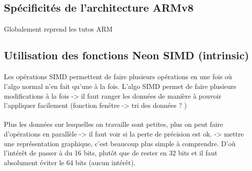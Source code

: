 \documentclass{article}
\begin{document}
    \subsection{Spécificités de l'architecture ARMv8}
    \paragraph{}
    Globalement reprend les tutos ARM

    \subsection{Utilisation des fonctions Neon SIMD (intrinsic)}

    \paragraph{}
    Les opérations SIMD permettent de faire plusieurs opérations en une fois où l'algo normal n'en fait qu'une à la fois. L'algo SIMD permet de faire plusieurs modifications à la fois -> il faut ranger les données de manière à pouvoir l'appliquer facilement (fonction fenêtre -> tri des données ? )


    \paragraph{}
    Plus les données sur lesquelles on travaille sont petites, plus on peut faire d'opérations en parallèle -> il faut voir si la perte de précision est ok. -> mettre une représentation graphique, c'est beaucoup plus simple à comprendre. D'où l'intérêt de passer à du 16 bits, plutôt que de rester en 32 bits et il faut absolument éviter le 64 bits (aucun intérêt).
\end{document}
